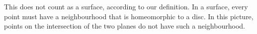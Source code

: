 This does not count as a surface, according to our definition.
In a surface, every point must have a neighbourhood that is 
homeomorphic to a disc.  In this picture, points on the 
intersection of the two planes do not have such a neighbourhood.